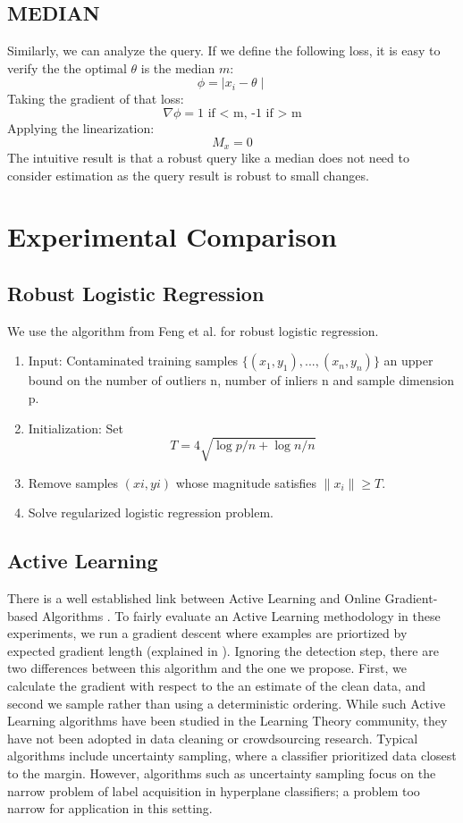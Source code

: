 \subsection{MEDIAN}
Similarly, we can analyze the \medfunc query.
If we define the following loss, it is easy to verify the the optimal $\theta$ is the median $m$:
\[
\phi = \mid x_{i} - \theta\mid
\]
Taking the gradient of that loss:
\[
\nabla\phi = \text{1 if < m, -1 if > m}
\]
Applying the linearization:
\[
M_x = 0
\]
The intuitive result is that a robust query like a median does not need to consider estimation as the query result is robust to small changes.

\section{Experimental Comparison}
\subsection{Robust Logistic Regression}\label{rlogit}
We use the algorithm from Feng et al. for robust logistic regression.
\begin{enumerate}
\item Input: Contaminated training samples $\{(x_1, y_1), . . . ,(x_{n}
, y_{n})\}$ an upper bound on the number of outliers n, number of inliers n and sample dimension p.
\item Initialization: Set \[T = 4\sqrt{\log p/n + \log n/n}\]
\item Remove samples $(xi
, yi)$ whose magnitude satisfies $\|x_i\| \ge T$.
\item Solve regularized logistic regression problem.
\end{enumerate}

\subsection{Active Learning}\label{al}
There is a well established link between Active Learning and Online Gradient-based Algorithms \cite{guillory2009active}. 
To fairly evaluate an Active Learning methodology in these experiments, we run a gradient descent where examples are priortized by expected gradient length (explained in \cite{settles2010active}).
Ignoring the detection step, there are two differences between this algorithm and the one we propose.
First, we calculate the gradient with respect to the an estimate of the clean data, and second we sample rather than using a deterministic ordering.
While such Active Learning algorithms have been studied in the Learning Theory community, they have not been adopted in data cleaning or crowdsourcing research.
Typical algorithms include uncertainty sampling, where a classifier prioritized data closest to the margin.
However, algorithms such as uncertainty sampling focus on the narrow problem of label acquisition in hyperplane classifiers; a problem too narrow for application in this setting.

